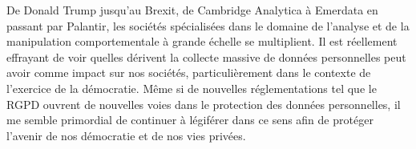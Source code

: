 \documentclass{article}
\begin{document}
De Donald Trump jusqu’au Brexit, de Cambridge Analytica à Emerdata en passant par Palantir, les sociétés spécialisées dans le domaine de l’analyse et de la manipulation comportementale à grande échelle se multiplient. Il est réellement effrayant de voir quelles dérivent la collecte massive de données personnelles peut avoir comme impact sur nos sociétés, particulièrement dans le contexte de l’exercice de la démocratie. Même si de nouvelles réglementations tel que le RGPD ouvrent de nouvelles voies dans le protection des données personnelles, il me semble primordial de continuer à légiférer dans ce sens afin de protéger l’avenir de nos démocratie et de nos vies privées.\\

\newpage

\printbibliography[
heading=bibintoc,
title={Bibliographie \& Références}
]







\restoregeometry
\end{document}
